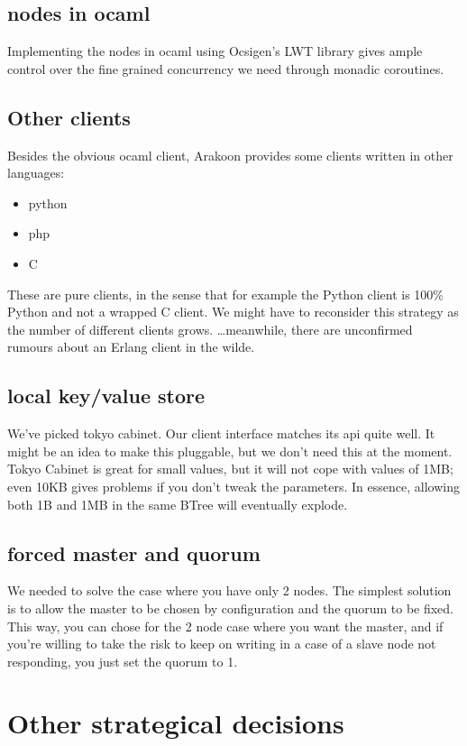 \subsection{nodes in ocaml}
Implementing the nodes in ocaml using Ocsigen's LWT library gives ample control over the fine grained concurrency we need through monadic coroutines.
\subsection{Other clients}
Besides the obvious ocaml client, Arakoon provides some clients written in other languages:
\begin{itemize}
\item{python}
\item{php}
\item{C}
\end{itemize}
These are pure clients, in the sense that for example the Python client is 100\% Python and not a wrapped C client. 
We might have to reconsider this strategy as the number of different clients grows. \ldots meanwhile, there are unconfirmed rumours about an Erlang client in the wilde.

\subsection{local key/value store}
We've picked tokyo cabinet. 
Our client interface matches its api quite well. 
It might be an idea to make this pluggable, but we don't need this at the moment.
Tokyo Cabinet is great for small values, but it will not cope with values of 1MB; 
even 10KB gives problems if you don't tweak the parameters. 
In essence, allowing both 1B and 1MB in the same BTree will eventually explode.

\subsection{forced master and quorum}
We needed to solve the case where you have only 2 nodes.
The simplest solution is to allow the master to be chosen by configuration and the quorum to be fixed. 
This way, you can chose for the 2 node case where you want the master, 
and if you're willing to take the risk to keep on writing in a case of a slave node not responding, you just set the quorum to 1.

\section{Other strategical decisions}

